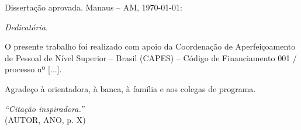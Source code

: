 \documentclass[
    12pt,
    openright,
    twoside,
    a4paper,
    chapter=TITLE,
    sumario=tradicional,
    section=TITLE,
    english,
    brazil
]{abntex2}
\begin{document}
\frenchspacing

\pretextual
\imprimircapa
\imprimirfolhaderosto

\begin{folhadeaprovacao}
\begin{center}
{\ABNTEXchapterfont\large\imprimirautor}
\vspace*{\fill}
\begin{center}
\ABNTEXchapterfont\bfseries\Large\imprimirtitulo
\end{center}
\vspace*{\fill}

\hspace{.45\textwidth}\begin{minipage}{.5\textwidth}
\imprimirpreambulo
\end{minipage}\vspace*{\fill}
\end{center}

Dissertação aprovada. Manaus -- AM, \today:

\assinatura{\textbf{\imprimirorientadorRotulo} \\ \imprimirorientador}
\end{folhadeaprovacao}

\begin{dedicatoria}
\vspace*{\fill}\centering
\textit{Dedicatória.}
\vspace*{\fill}
\end{dedicatoria}

\begin{agradecimentos}
O presente trabalho foi realizado com apoio da Coordenação de
Aperfeiçoamento de Pessoal de Nível Superior -- Brasil (CAPES) --
Código de Financiamento 001 / processo nº [...].

Agradeço à orientadora, à banca, à família e aos colegas de
programa.
\end{agradecimentos}

\begin{epigrafe}
\vspace*{\fill}
\begin{flushright}
\textit{``Citação inspiradora.''} \\
(AUTOR, ANO, p. X)
\end{flushright}
\end{epigrafe}
\end{document}
